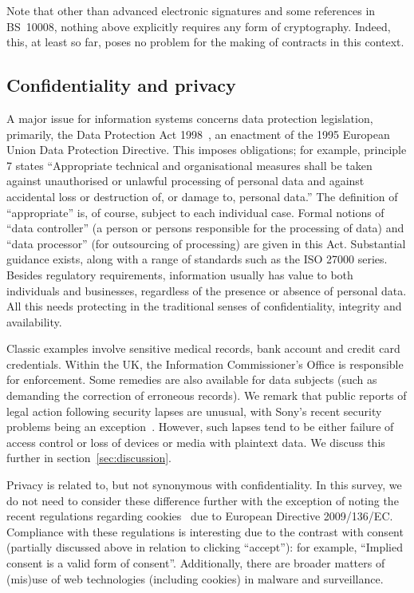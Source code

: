\documentclass{article}
\def\cite{\citep}
\begin{document}
Note that other than advanced electronic signatures and some references in BS~10008, nothing above
explicitly requires any form of cryptography.  Indeed, this, at least
so far, poses no problem for the making of contracts in this context.

\subsection{Confidentiality and privacy}

A major issue for information systems concerns data protection
legislation, primarily, the Data Protection Act 1998~\cite{DPA1998},
an enactment of the 1995 European Union Data Protection Directive. 
This imposes obligations; 
for example, principle 7 states ``Appropriate technical and organisational measures shall be taken against unauthorised or unlawful processing of personal data and against accidental loss or destruction of, or damage to, personal data.'' 
The definition of “appropriate” is, of course, subject to each individual case.
Formal notions of “data controller” (a person or persons responsible for the processing of data) and “data processor” (for outsourcing of processing) are given in this Act.
Substantial guidance exists, along with a range of standards such as the ISO 27000 series.
Besides regulatory requirements, information usually has value to both individuals and
businesses, regardless of the presence or absence of personal data.
All this needs protecting in the traditional senses of
confidentiality, integrity and availability.

Classic examples involve sensitive medical records, bank account and credit card credentials.  
Within the UK, the Information Commissioner's Office is responsible for enforcement.  
Some remedies are also available for data subjects (such as demanding the correction of erroneous records).  
We remark that public reports of legal action following security
lapses are unusual, with Sony's recent security problems being an
exception~\cite{mSony}.  However, such lapses tend to be either
failure of access control or loss of devices or media with plaintext
data.  We discuss this further in section~\ref{sec:discussion}.

Privacy is related to, but not synonymous with confidentiality.  
In this survey, we do not need to consider these difference further with the exception of noting the recent regulations regarding cookies~\cite{mICO2} due to European Directive 2009/136/EC.
Compliance with these regulations is interesting due to the contrast with consent (partially discussed above in relation to clicking “accept”): for example, “Implied consent is a valid form of consent”.
Additionally, there are  broader matters of (mis)use of web technologies (including cookies) in malware and surveillance. 
\end{document}
